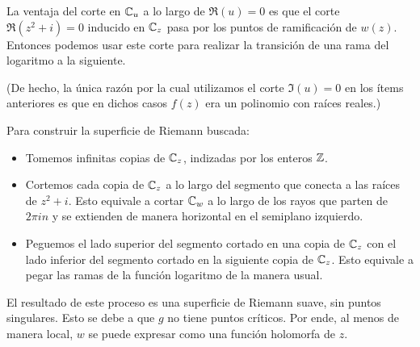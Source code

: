 \begin{solution}
\begin{itemize}
\begin{enumerate}[label=\alph*)]
        La ventaja del corte en $\mathbb C_u$ a lo largo de $\Re(u) = 0$ es que el corte $\Re(z^2 + i) = 0$ inducido en $\mathbb C_z$ pasa por los puntos de ramificación de $w(z)$. Entonces podemos usar este corte para realizar la transición de una rama del logaritmo a la siguiente.
        
        (De hecho, la única razón por la cual utilizamos el corte $\Im(u) = 0$ en los ítems anteriores es que en dichos casos $f(z)$ era un polinomio con raíces reales.)
        
        Para construir la superficie de Riemann buscada:
        \begin{itemize}
            \item Tomemos infinitas copias de $\mathbb C_z$, indizadas por los enteros $\mathbb Z$.
            
            \item Cortemos cada copia de $\mathbb C_z$ a lo largo del segmento que conecta a las raíces de $z^2 + i$. Esto equivale a cortar $\mathbb C_w$ a lo largo de los rayos que parten de $2\pi in$ y se extienden de manera horizontal en el semiplano izquierdo.
            
            \item Peguemos el lado superior del segmento cortado en una copia de $\mathbb C_z$ con el lado inferior del segmento cortado en la siguiente copia de $\mathbb C_z$. Esto equivale a pegar las ramas de la función logaritmo de la manera usual.
        \end{itemize}
        
        El resultado de este proceso es una superficie de Riemann suave, sin puntos singulares. Esto se debe a que $g$ no tiene puntos críticos. Por ende, al menos de manera local, $w$ se puede expresar como una función holomorfa de $z$.
        

\end{enumerate}
\end{itemize}
\end{solution}
